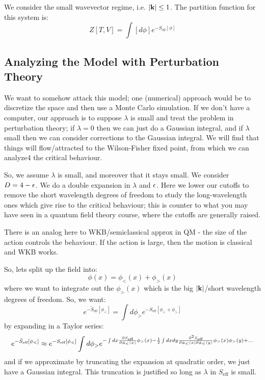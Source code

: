 We consider the small wavevector regime, i.e. $\lvert \mathbf{k} \rvert \leq 1$. The partition function for this system is:
\begin{equation}
    Z[T, V] = \int [d\phi] e^{-S_{\text{eff}}[\phi]}
\end{equation}

\subsection{Analyzing the Model with Perturbation Theory}
We want to somehow attack this model; one (numerical) approach would be to discretize the space and then use a Monte Carlo simulation. If we don't have a computer, our approach is to suppose $\lambda$ is small and treat the problem in perturbation theory; if $\lambda = 0$ then we can just do a Gaussian integral, and if $\lambda$ small then we can consider corrections to the Gaussian integral. We will find that things will flow/attracted to the Wilson-Fisher fixed point, from which we can analyze4 the critical behaviour.

So, we assume $\lambda$ is small, and moreover that it stays small. We consider $D = 4-\epsilon$. We do a double expansion in $\lambda$ and $\epsilon$. Here we lower our cutoffs to remove the short wavelength degrees of freedom to study the long-wavelength ones which give rise to the critical behaviour; this is counter to what you may have seen in a quantum field theory course, where the cutoffs are generally raised. 

There is an analog here to WKB/semiclassical approx in QM - the size of the action controls the behaviour. If the action is large, then the motion is classical and WKB works.

So, lets split up the field into:
\begin{equation}
    \phi(x) = \phi_<(x) + \phi_>(x)
\end{equation}
where we want to integrate out the $\phi_>(x)$ which is the big $\lvert \mathbf{k} \rvert$/short wavelength degrees of freedom. So, we want:
\begin{equation}
    e^{-\tilde{S}_{\text{eff}}[\phi_<]} = \int d\phi_> e^{-S_{\text{eff}}[\phi_< + \phi_>]}
\end{equation}
by expanding in a Taylor series:
\begin{equation}
    e^{-\tilde{S}_{\text{eff}}[\phi_<]} \approx e^{-S_{\text{eff}}[\phi_<]}\int d\phi_> e^{-\int dx \dpd{S_{\text{eff}}}{\phi_<(x)}\phi_>(x) - \frac{1}{2}\int dxdy \frac{\partial^2 S_{\text{eff}}}{\partial \phi_<(x)\partial \phi_<(y)}\phi_>(x)\phi_>(y) + \ldots}
\end{equation}
and if we approximate by truncating the expansion at quadratic order, we just have a Gaussian integral. This truncation is justified so long as $\lambda$ in $S_{\text{eff}}$ is small.

